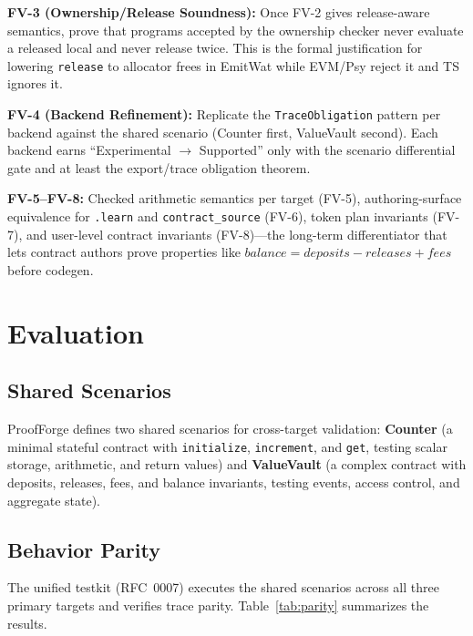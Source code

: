 \documentclass[sigconf]{acmart}
\begin{document}
\textbf{FV-3 (Ownership/Release Soundness):} Once FV-2 gives release-aware semantics, prove
that programs accepted by the ownership checker never evaluate a released local and never
release twice. This is the formal justification for lowering \texttt{release} to allocator frees
in EmitWat while EVM/Psy reject it and TS ignores it.

\textbf{FV-4 (Backend Refinement):} Replicate the \texttt{TraceObligation} pattern per backend
against the shared scenario (Counter first, ValueVault second). Each backend earns
``Experimental $\to$ Supported'' only with the scenario differential gate and at least the
export/trace obligation theorem.

\textbf{FV-5--FV-8:} Checked arithmetic semantics per target (FV-5), authoring-surface
equivalence for \texttt{.learn} and \texttt{contract\_source} (FV-6), token plan invariants
(FV-7), and user-level contract invariants (FV-8)---the long-term differentiator that lets
contract authors prove properties like $\textit{balance} = \textit{deposits} - \textit{releases} + \textit{fees}$
before codegen.

\section{Evaluation}
\label{sec:eval}

\subsection{Shared Scenarios}

ProofForge defines two shared scenarios for cross-target validation:
\textbf{Counter} (a minimal stateful contract with \texttt{initialize}, \texttt{increment},
and \texttt{get}, testing scalar storage, arithmetic, and return values) and
\textbf{ValueVault} (a complex contract with deposits, releases, fees, and balance invariants,
testing events, access control, and aggregate state).

\subsection{Behavior Parity}

The unified testkit (RFC~0007) executes the shared scenarios across all three primary targets
and verifies trace parity. Table~\ref{tab:parity} summarizes the results.
\end{document}
